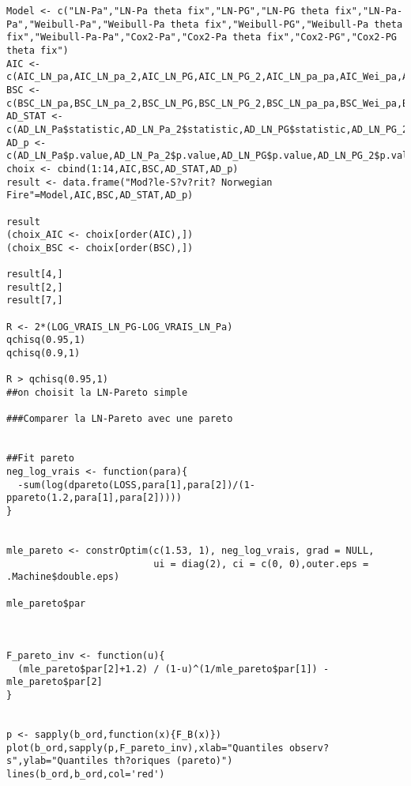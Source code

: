 \begin{verbatim}
Model <- c("LN-Pa","LN-Pa theta fix","LN-PG","LN-PG theta fix","LN-Pa-Pa","Weibull-Pa","Weibull-Pa theta fix","Weibull-PG","Weibull-Pa theta fix","Weibull-Pa-Pa","Cox2-Pa","Cox2-Pa theta fix","Cox2-PG","Cox2-PG theta fix")
AIC <- c(AIC_LN_pa,AIC_LN_pa_2,AIC_LN_PG,AIC_LN_PG_2,AIC_LN_pa_pa,AIC_Wei_pa,AIC_Wei_pa_2,AIC_Wei_PG,AIC_Wei_PG_2,AIC_Wei_pa_pa,AIC_cox_pa,AIC_cox_pa_2,AIC_cox_PG,AIC_cox_PG_2)
BSC <- c(BSC_LN_pa,BSC_LN_pa_2,BSC_LN_PG,BSC_LN_PG_2,BSC_LN_pa_pa,BSC_Wei_pa,BSC_Wei_pa_2,BSC_Wei_PG,BSC_Wei_PG_2,BSC_Wei_pa_pa,BSC_cox_pa,BSC_cox_pa_2,BSC_cox_PG,BSC_cox_PG_2)
AD_STAT <-  c(AD_LN_Pa$statistic,AD_LN_Pa_2$statistic,AD_LN_PG$statistic,AD_LN_PG_2$statistic,AD_LN_Pa_Pa$statistic,AD_Wei_Pa$statistic,AD_Wei_Pa_2$statistic,AD_Wei_PG$statistic,AD_Wei_PG_2$statistic,AD_Wei_Pa_Pa$statistic,AD_cox_pa$statistic,AD_cox_pa_2$statistic,AD_cox_PG$statistic,AD_cox_PG_2$statistic) 
AD_p <- c(AD_LN_Pa$p.value,AD_LN_Pa_2$p.value,AD_LN_PG$p.value,AD_LN_PG_2$p.value,AD_LN_Pa_Pa$p.value,AD_Wei_Pa$p.value,AD_Wei_Pa_2$p.value,AD_Wei_PG$p.value,AD_Wei_PG_2$p.value,AD_Wei_Pa_Pa$p.value,AD_cox_pa$p.value,AD_cox_pa_2$p.value,AD_cox_PG$p.value,AD_cox_PG_2$p.value)
choix <- cbind(1:14,AIC,BSC,AD_STAT,AD_p)
result <- data.frame("Mod?le-S?v?rit? Norwegian Fire"=Model,AIC,BSC,AD_STAT,AD_p)

result
(choix_AIC <- choix[order(AIC),])
(choix_BSC <- choix[order(BSC),])

result[4,]
result[2,]
result[7,]

R <- 2*(LOG_VRAIS_LN_PG-LOG_VRAIS_LN_Pa)
qchisq(0.95,1)
qchisq(0.9,1)

R > qchisq(0.95,1)
##on choisit la LN-Pareto simple

###Comparer la LN-Pareto avec une pareto


##Fit pareto
neg_log_vrais <- function(para){
  -sum(log(dpareto(LOSS,para[1],para[2])/(1-ppareto(1.2,para[1],para[2]))))
}


mle_pareto <- constrOptim(c(1.53, 1), neg_log_vrais, grad = NULL, 
                          ui = diag(2), ci = c(0, 0),outer.eps = .Machine$double.eps)

mle_pareto$par



F_pareto_inv <- function(u){
  (mle_pareto$par[2]+1.2) / (1-u)^(1/mle_pareto$par[1]) - mle_pareto$par[2]
}


p <- sapply(b_ord,function(x){F_B(x)})
plot(b_ord,sapply(p,F_pareto_inv),xlab="Quantiles observ?s",ylab="Quantiles th?oriques (pareto)")
lines(b_ord,b_ord,col='red')



\end{verbatim}
